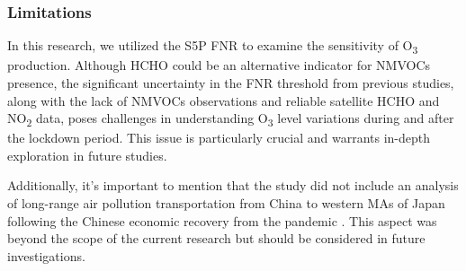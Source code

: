 \subsubsection*{Limitations}
In this research, we utilized the S5P FNR to examine the sensitivity of O\textsubscript{3} production. Although HCHO could be an alternative indicator for NMVOCs presence, the significant uncertainty in the FNR threshold from previous studies, along with the lack of NMVOCs observations and reliable satellite HCHO and NO\textsubscript{2} data, poses challenges in understanding O\textsubscript{3} level variations during and after the lockdown period. This issue is particularly crucial and warrants in-depth exploration in future studies. \par
Additionally, it's important to mention that the study did not include an analysis of long-range air pollution transportation from China to western MAs of Japan following the Chinese economic recovery from the pandemic \citep{itahashi2022returning}. This aspect was beyond the scope of the current research but should be considered in future investigations. \par

